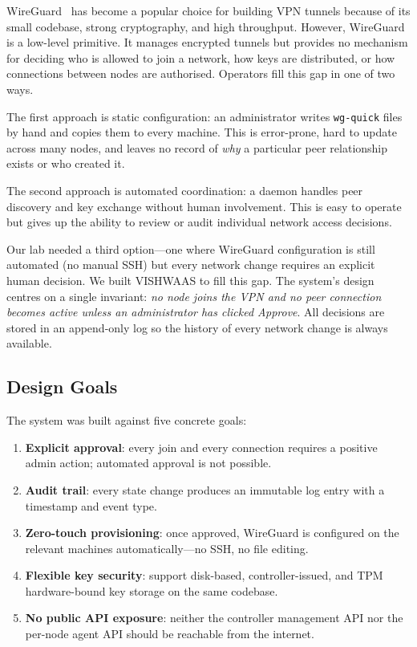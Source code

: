 \documentclass[conference]{IEEEtran}
\begin{document}
WireGuard~\cite{donenfeld2017wireguard} has become a popular choice for
building VPN tunnels because of its small codebase, strong cryptography,
and high throughput. However, WireGuard is a low-level primitive. It manages
encrypted tunnels but provides no mechanism for deciding who is allowed to
join a network, how keys are distributed, or how connections between nodes
are authorised. Operators fill this gap in one of two ways.

The first approach is static configuration: an administrator writes
\texttt{wg-quick} files by hand and copies them to every machine. This is
error-prone, hard to update across many nodes, and leaves no record of
\textit{why} a particular peer relationship exists or who created it.

The second approach is automated coordination: a daemon handles peer
discovery and key exchange without human involvement. This is easy to
operate but gives up the ability to review or audit individual network
access decisions.

Our lab needed a third option---one where WireGuard configuration is still
automated (no manual SSH) but every network change requires an explicit
human decision. We built VISHWAAS to fill this gap. The system's design
centres on a single invariant: \emph{no node joins the VPN and no peer
connection becomes active unless an administrator has clicked Approve}.
All decisions are stored in an append-only log so the history of every
network change is always available.

\subsection{Design Goals}

The system was built against five concrete goals:

\begin{enumerate}
  \item \textbf{Explicit approval}: every join and every connection requires a
        positive admin action; automated approval is not possible.
  \item \textbf{Audit trail}: every state change produces an immutable log
        entry with a timestamp and event type.
  \item \textbf{Zero-touch provisioning}: once approved, WireGuard is
        configured on the relevant machines automatically---no SSH, no file
        editing.
  \item \textbf{Flexible key security}: support disk-based, controller-issued,
        and TPM hardware-bound key storage on the same codebase.
  \item \textbf{No public API exposure}: neither the controller management API
        nor the per-node agent API should be reachable from the internet.
\end{enumerate}
\end{document}
